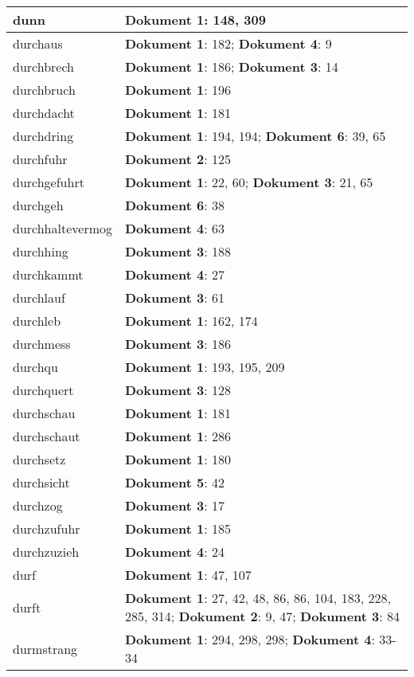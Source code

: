 \documentclass[a5paper]{article}
\begin{document}
\begin{longtable}[l]{|l|p{3in}|}
\hline
dunn & \textbf{Dokument 1}: 148, 309 \\
\hline
durchaus & \textbf{Dokument 1}: 182; \textbf{Dokument 4}: 9 \\
\hline
durchbrech & \textbf{Dokument 1}: 186; \textbf{Dokument 3}: 14 \\
\hline
durchbruch & \textbf{Dokument 1}: 196 \\
\hline
durchdacht & \textbf{Dokument 1}: 181 \\
\hline
durchdring & \textbf{Dokument 1}: 194, 194; \textbf{Dokument 6}: 39, 65 \\
\hline
durchfuhr & \textbf{Dokument 2}: 125 \\
\hline
durchgefuhrt & \textbf{Dokument 1}: 22, 60; \textbf{Dokument 3}: 21, 65 \\
\hline
durchgeh & \textbf{Dokument 6}: 38 \\
\hline
durchhaltevermog & \textbf{Dokument 4}: 63 \\
\hline
durchhing & \textbf{Dokument 3}: 188 \\
\hline
durchkammt & \textbf{Dokument 4}: 27 \\
\hline
durchlauf & \textbf{Dokument 3}: 61 \\
\hline
durchleb & \textbf{Dokument 1}: 162, 174 \\
\hline
durchmess & \textbf{Dokument 3}: 186 \\
\hline
durchqu & \textbf{Dokument 1}: 193, 195, 209 \\
\hline
durchquert & \textbf{Dokument 3}: 128 \\
\hline
durchschau & \textbf{Dokument 1}: 181 \\
\hline
durchschaut & \textbf{Dokument 1}: 286 \\
\hline
durchsetz & \textbf{Dokument 1}: 180 \\
\hline
durchsicht & \textbf{Dokument 5}: 42 \\
\hline
durchzog & \textbf{Dokument 3}: 17 \\
\hline
durchzufuhr & \textbf{Dokument 1}: 185 \\
\hline
durchzuzieh & \textbf{Dokument 4}: 24 \\
\hline
durf & \textbf{Dokument 1}: 47, 107 \\
\hline
durft & \textbf{Dokument 1}: 27, 42, 48, 86, 86, 104, 183, 228, 285, 314; \textbf{Dokument 2}: 9, 47; \textbf{Dokument 3}: 84 \\
\hline
durmstrang & \textbf{Dokument 1}: 294, 298, 298; \textbf{Dokument 4}: 33-34 \\

\end{longtable}
\end{document}
